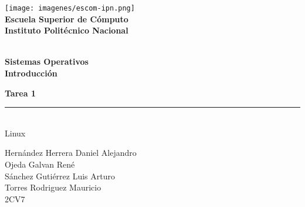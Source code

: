 
\begin{titlepage} %

    \begin{flushright}

	   \texttt{[image: imagenes/escom-ipn.png]}
	   \large \textbf{\\Escuela Superior de C\'omputo}
	   \large \textbf{\\Instituto Polit\'ecnico Nacional }%

	   \vspace{2.5cm} %

	   \large \textbf{\\Sistemas Operativos}%
	   \large \textbf{\\Introducción}%

	   \vspace{1.2cm} %

	   \large \textbf{Tarea 1}\\%
	   \rule{5cm}{3pt} %
	   \large{\\ Linux} %

	   \vspace{2.5cm} %

	   Hernández Herrera Daniel Alejandro \\
	   Ojeda Galvan René \\ 
	   Sánchez Gutiérrez Luis Arturo \\ 
	   Torres Rodriguez Mauricio \\  %
	   2CV7 %

	   \vspace{2.5cm} %

	   \date{\today}

    \end{flushright}

\end{titlepage}
